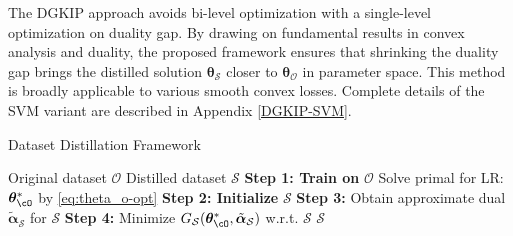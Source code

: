 The DGKIP approach avoids bi-level optimization with a single-level optimization on duality gap. By drawing on fundamental results in convex analysis and duality, the proposed framework ensures that shrinking the duality gap brings the distilled solution $\boldsymbol{\theta}_{\mathcal{S}}$ closer to $\boldsymbol{\theta}_{\mathcal{O}}$ in parameter space. This method is broadly applicable to various smooth convex losses. Complete details of the SVM variant are described in Appendix \ref{DGKIP-SVM}.

\begin{algorithm}[t]
\caption{Dataset Distillation Framework}
\label{alg:distillation}
\begin{algorithmic}
    \Require Original dataset $\mathcal{O}$
    \Ensure Distilled dataset $\mathcal{S}$
    \State \textbf{Step 1: Train on } $\mathcal{O}$
        \State \quad Solve primal for LR: 
               ${\bm \theta_{\cO}^*}$ by \eqref{eq:theta_o-opt}
    \State \textbf{Step 2: Initialize } $\mathcal{S}$ 
    \Repeat
        \State \textbf{Step 3:} Obtain approximate dual $\tilde{\boldsymbol{\alpha}}_\mathcal{S}$ for $\mathcal{S}$
        \State \textbf{Step 4:} Minimize $G_{\mathcal{S}}({\bm \theta_{\cO}^*}, \tilde{\boldsymbol{\alpha}}_\mathcal{S})$ 
                 w.r.t. $\mathcal{S}$
     $\mathcal{S}$
\end{algorithmic}
\end{algorithm}